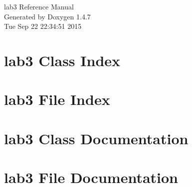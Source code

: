 \documentclass[a4paper]{book}
\begin{document}
\begin{titlepage}
\vspace*{7cm}
\begin{center}
{\Large lab3 Reference Manual}\\
\vspace*{1cm}
{\large Generated by Doxygen 1.4.7}\\
\vspace*{0.5cm}
{\small Tue Sep 22 22:34:51 2015}\\
\end{center}
\end{titlepage}
\clearemptydoublepage
{}
\tableofcontents
\clearemptydoublepage
{}
\chapter{lab3 Class Index}

\chapter{lab3 File Index}

\chapter{lab3 Class Documentation}

\chapter{lab3 File Documentation}





\printindex
\end{document}
